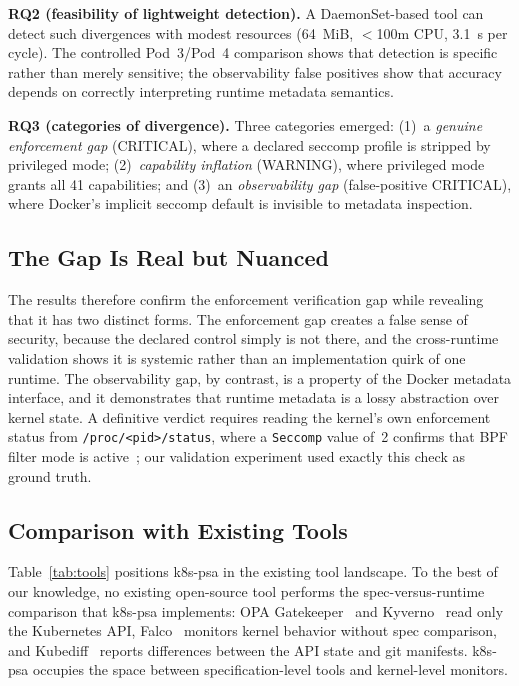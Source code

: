 \documentclass[sigconf]{acmart}
\begin{document}
\textbf{RQ2 (feasibility of lightweight detection).} A DaemonSet-based tool can detect such divergences with modest resources (64~MiB, $<$100m CPU, 3.1~s per cycle). The controlled Pod~3/Pod~4 comparison shows that detection is specific rather than merely sensitive; the observability false positives show that accuracy depends on correctly interpreting runtime metadata semantics.

\textbf{RQ3 (categories of divergence).} Three categories emerged: (1)~a \emph{genuine enforcement gap} (CRITICAL), where a declared seccomp profile is stripped by privileged mode; (2)~\emph{capability inflation} (WARNING), where privileged mode grants all 41 capabilities; and (3)~an \emph{observability gap} (false-positive CRITICAL), where Docker's implicit seccomp default is invisible to metadata inspection.

\subsection{The Gap Is Real but Nuanced}

The results therefore confirm the enforcement verification gap while revealing that it has two distinct forms. The enforcement gap creates a false sense of security, because the declared control simply is not there, and the cross-runtime validation shows it is systemic rather than an implementation quirk of one runtime. The observability gap, by contrast, is a property of the Docker metadata interface, and it demonstrates that runtime metadata is a lossy abstraction over kernel state. A definitive verdict requires reading the kernel's own enforcement status from \texttt{/proc/<pid>/status}, where a \texttt{Seccomp} value of~2 confirms that BPF filter mode is active~\cite{kep2413}; our validation experiment used exactly this check as ground truth.

\subsection{Comparison with Existing Tools}

Table~\ref{tab:tools} positions k8s-psa in the existing tool landscape. To the best of our knowledge, no existing open-source tool performs the spec-versus-runtime comparison that k8s-psa implements: OPA Gatekeeper~\cite{gatekeeper2024} and Kyverno~\cite{kyverno2024} read only the Kubernetes API, Falco~\cite{falco2024} monitors kernel behavior without spec comparison, and Kubediff~\cite{kubediff2020} reports differences between the API state and git manifests. k8s-psa occupies the space between specification-level tools and kernel-level monitors.
\end{document}
